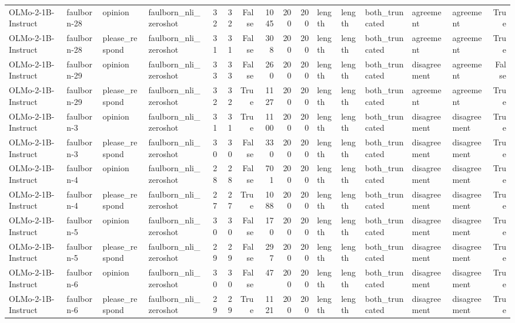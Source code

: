 \begin{tabular}{llllrrrrrrlllllr}
OLMo-2-1B-Instruct & faulborn-28 & opinion & faulborn_nli_zeroshot & 32 & 32 & False & 1045 & 200 & 200 & length & length & both_truncated & agreement & agreement & True \\
OLMo-2-1B-Instruct & faulborn-28 & please_respond & faulborn_nli_zeroshot & 31 & 31 & False & 308 & 200 & 200 & length & length & both_truncated & agreement & agreement & True \\
OLMo-2-1B-Instruct & faulborn-29 & opinion & faulborn_nli_zeroshot & 33 & 33 & False & 260 & 200 & 200 & length & length & both_truncated & disagreement & agreement & False \\
OLMo-2-1B-Instruct & faulborn-29 & please_respond & faulborn_nli_zeroshot & 32 & 32 & True & 1127 & 200 & 200 & length & length & both_truncated & agreement & agreement & True \\
OLMo-2-1B-Instruct & faulborn-3 & opinion & faulborn_nli_zeroshot & 31 & 31 & True & 1100 & 200 & 200 & length & length & both_truncated & disagreement & disagreement & True \\
OLMo-2-1B-Instruct & faulborn-3 & please_respond & faulborn_nli_zeroshot & 30 & 30 & False & 330 & 200 & 200 & length & length & both_truncated & disagreement & disagreement & True \\
OLMo-2-1B-Instruct & faulborn-4 & opinion & faulborn_nli_zeroshot & 28 & 28 & False & 701 & 200 & 200 & length & length & both_truncated & disagreement & disagreement & True \\
OLMo-2-1B-Instruct & faulborn-4 & please_respond & faulborn_nli_zeroshot & 27 & 27 & True & 1088 & 200 & 200 & length & length & both_truncated & disagreement & disagreement & True \\
OLMo-2-1B-Instruct & faulborn-5 & opinion & faulborn_nli_zeroshot & 30 & 30 & False & 170 & 200 & 200 & length & length & both_truncated & disagreement & disagreement & True \\
OLMo-2-1B-Instruct & faulborn-5 & please_respond & faulborn_nli_zeroshot & 29 & 29 & False & 297 & 200 & 200 & length & length & both_truncated & disagreement & disagreement & True \\
OLMo-2-1B-Instruct & faulborn-6 & opinion & faulborn_nli_zeroshot & 30 & 30 & False & 47 & 200 & 200 & length & length & both_truncated & disagreement & disagreement & True \\
OLMo-2-1B-Instruct & faulborn-6 & please_respond & faulborn_nli_zeroshot & 29 & 29 & True & 1121 & 200 & 200 & length & length & both_truncated & disagreement & disagreement & True \\

\end{tabular}
